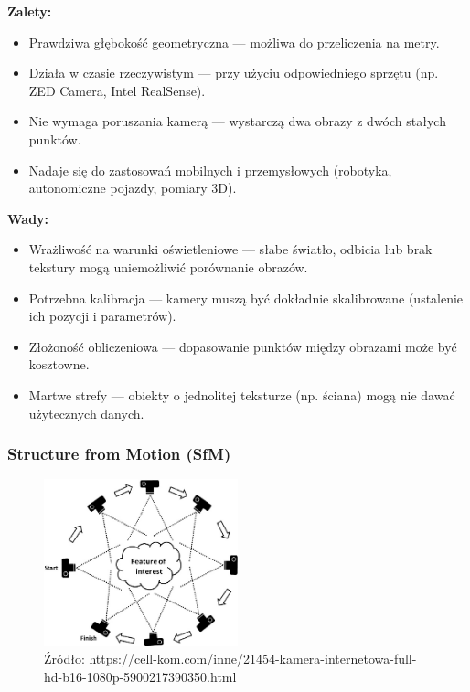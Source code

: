 \documentclass[magisterska]{pracadypl}
\begin{document}
\begin{minipage}[t]{0.45\textwidth}
\textbf{Zalety:}
\begin{itemize}
  \item Prawdziwa głębokość geometryczna — możliwa do przeliczenia na metry.

  \item Działa w czasie rzeczywistym — przy użyciu odpowiedniego sprzętu (np. ZED Camera, Intel RealSense).

  \item Nie wymaga poruszania kamerą — wystarczą dwa obrazy z dwóch stałych punktów.

  \item Nadaje się do zastosowań mobilnych i przemysłowych (robotyka, autonomiczne pojazdy, pomiary 3D).
\end{itemize}
\end{minipage}
\hfill
\begin{minipage}[t]{0.45\textwidth}
\textbf{Wady:}
\begin{itemize}
  \item Wrażliwość na warunki oświetleniowe — słabe światło, odbicia lub brak tekstury mogą uniemożliwić porównanie obrazów.

  \item Potrzebna kalibracja — kamery muszą być dokładnie skalibrowane (ustalenie ich pozycji i parametrów).

  \item Złożoność obliczeniowa — dopasowanie punktów między obrazami może być kosztowne.

  \item Martwe strefy — obiekty o jednolitej teksturze (np. ściana) mogą nie dawać użytecznych danych.
\end{itemize}
\end{minipage}

\subsubsection{Structure from Motion (SfM)}

\begin{figure}[h]  %
    \centering  %
    \includegraphics[width=0.5\textwidth]{images/SFM.png}  %
    \captionsetup{labelformat=empty, font=footnotesize}
    \caption{Źródło: https://cell-kom.com/inne/21454-kamera-internetowa-full-hd-b16-1080p-5900217390350.html}
    \label{fig:mono}  %
\end{figure}
\end{document}

